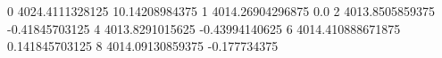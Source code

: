 0 4024.4111328125 10.14208984375
1 4014.26904296875 0.0
2 4013.8505859375 -0.41845703125
4 4013.8291015625 -0.43994140625
6 4014.410888671875 0.141845703125
8 4014.09130859375 -0.177734375

